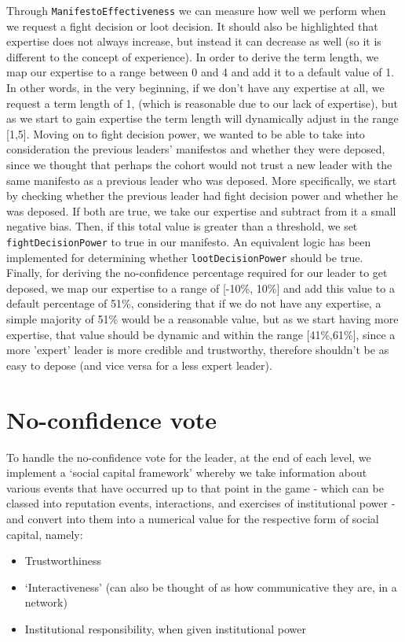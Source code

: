 Through \verb|ManifestoEffectiveness| we can measure how well we perform when we request a fight decision or loot decision. It should also be highlighted that expertise does not always increase, but instead it can decrease as well (so it is different to the concept of experience). In order to derive the term length, we map our expertise to a range between 0 and 4 and add it to a default value of 1. In other words, in the very beginning, if we don't have any expertise at all, we request a term length of 1, (which is reasonable due to our lack of expertise), but as we start to gain expertise the term length will dynamically adjust in the range [1,5]. Moving on to fight decision power, we wanted to be able to take into consideration the previous leaders' manifestos and whether they were deposed, since we thought that perhaps the cohort would not trust a new leader with the same manifesto as a previous leader who was deposed. More specifically, we start by checking whether the previous leader had fight decision power and whether he was deposed. If both are true, we take our expertise and subtract from it a small negative bias. Then, if this total value is greater than a threshold, we set \verb|fightDecisionPower| to true in our manifesto. An equivalent logic has been implemented for determining whether \verb|lootDecisionPower| should be true. Finally, for deriving the no-confidence percentage required for our leader to get deposed, we map our expertise to a range of [-10\%, 10\%] and add this value to a default percentage of 51\%, considering that if we do not have any expertise, a simple majority of 51\% would be a reasonable value, but as we start having more expertise, that value should be dynamic and within the range [41\%,61\%], since a more 'expert' leader is more credible and trustworthy, therefore shouldn't be as easy to depose (and vice versa for a less expert leader).\\

\section{No-confidence vote}
To handle the no-confidence vote for the leader, at the end of each level, we implement a `social capital framework' whereby we take information about various events that have occurred up to that point in the game - which can be classed into reputation events, interactions, and exercises of institutional power - and convert  into them into a numerical value for the respective form of social capital, namely: 
\begin{itemize} 
\item{Trustworthiness}
\item{`Interactiveness' (can also be thought of as how communicative they are, in a network)} \item{Institutional responsibility, when given institutional power}
\end{itemize}

